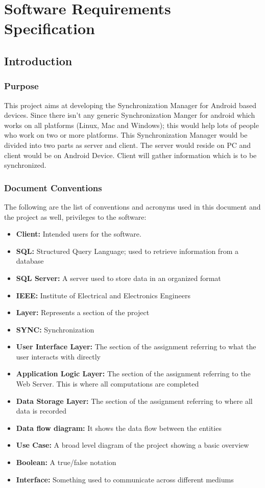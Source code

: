 \chapter{Software Requirements Specification}
\section{Introduction}
\subsection{Purpose}
\hspace*{0.82cm}This project aims at developing the Synchronization Manager for Android based devices.
Since there isn't any generic Synchronization Manger for android which works on all platforms
(Linux, Mac and Windows); this would help lots of people who work on two or more platforms. This
Synchronization Manager would be divided into two parts as server and client. The server would
reside on PC and client would be on Android Device. Client will gather information which is to be
synchronized.
\subsection{Document Conventions}
\hspace*{0.82cm}The following are the list of conventions and acronyms used in this document and the project as well,
privileges to the software:
\begin{itemize}
 \item \textbf{Client:} Intended users for the software.
 \item \textbf{SQL:} Structured Query Language; used to retrieve information from a database
 \item \textbf{SQL Server:} A server used to store data in an organized format
 \item \textbf{IEEE:} Institute of Electrical and Electronics Engineers
 \item \textbf{Layer:} Represents a section of the project
 \item \textbf{SYNC:} Synchronization
 \item \textbf{User Interface Layer:} The section of the assignment referring to what the user interacts with directly
 \item \textbf{Application Logic Layer:} The section of the assignment referring to the Web Server. This is where all 
computations are completed
 \item \textbf{Data Storage Layer:} The section of the assignment referring to where all data is recorded
 \item \textbf{Data flow diagram:} It shows the data flow between the entities
 \item \textbf{Use Case:} A broad level diagram of the project showing a basic overview
 \item \textbf{Boolean:} A true/false notation
 \item \textbf{Interface:} Something used to communicate across different mediums
\end{itemize}


